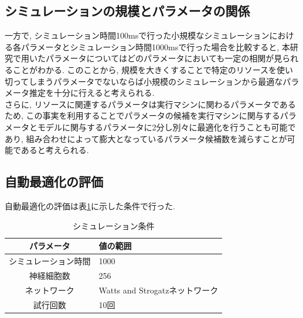 \subsection{シミュレーションの規模とパラメータの関係}
一方で, シミュレーション時間100msで行った小規模なシミュレーションにおける各パラメータとシミュレーション時間1000msで行った場合を比較すると,
本研究で用いたパラメータについてはどのパラメータにおいても一定の相関が見られることがわかる.
このことから, 規模を大きくすることで特定のリソースを使い切ってしまうパラメータでないならば小規模のシミュレーションから最適なパラメータ推定を十分に行えると考えられる.\\
さらに, リソースに関連するパラメータは実行マシンに関わるパラメータであるため,
この事実を利用することでパラメータの候補を実行マシンに関与するパラメータとモデルに関与するパラメータに2分し別々に最適化を行うことも可能であり,
組み合わせによって膨大となっているパラメータ候補数を減らすことが可能であると考えられる.\\

\subsection{自動最適化の評価}
自動最適化の評価は表\ref{table:sim-cond}に示した条件で行った.\\
\begin{table}[htb]
{\footnotesize
  \caption {シミュレーション条件}
  \begin{center}
    \begin{tabular}{|c|l|}
      \hline
      パラメータ & 値の範囲\\ \hline
      シミュレーション時間 & 1000\\ \hline
      神経細胞数 & 256\\ \hline
      ネットワーク & Watts and Strogatzネットワーク\\ \hline
      試行回数 & 10回 \\ \hline
    \end{tabular}
    \label{table:sim-cond}
  \end{center}
}
\end{table}

